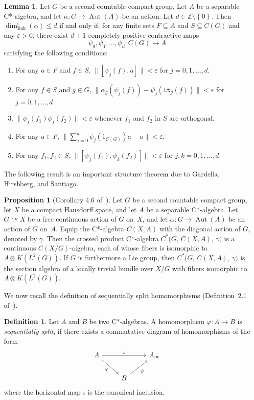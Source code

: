 \documentclass[10pt]{amsart}
\numberwithin{equation}{section}
\theoremstyle{definition}
\newtheorem{lem}[thm]{Lemma}
\newtheorem{prp}[thm]{Proposition}
\newtheorem{dfn}[thm]{Definition}
\newcommand{\gm}{\gamma}
\newcommand{\ep}{\varepsilon}
\newcommand{\ph}{\varphi}
\newcommand{\ps}{\psi}
\newcommand{\Z}{{\mathbb{Z}}}
\newcommand{\Aut}{{\operatorname{Aut}}}
\newcommand{\set}[1]{\left\{ #1 \right\}}
\newcommand{\RD}{{\operatorname{dim}}_{\operatorname{Rok}}^{\operatorname{c}}}
\begin{document}
\begin{lem}\label{D_6326_SeqSpl}
Let $G$ be a second countable compact group. Let $A$ be a separable C*-algebra,
and let $\alpha \colon G \to \Aut (A)$ be an action.
Let $d \in \Z \setminus \set{0}$.
Then $\RD (\alpha) \leq d$ if and only if, for any finite sets
$F \subseteq A$ and $S \subseteq C (G)$ and any $\ep > 0$,
there exist $d + 1$ completely positive contractive maps
\[
\psi_0, \psi_1, \ldots, \psi_d \colon C (G) \to A
\]
satisfying the following conditions:
\begin{enumerate}
\item
For any $a \in F$ and $f\in S$,
$\|[\psi_j(f), a]\| < \ep$ for $j = 0, 1, \ldots, d$.
\item
For any $f\in S$ and $g\in G$,
$\|\alpha_g (\psi_j(f)) - \psi_j(\mathtt{Lt}_g (f)) \| < \ep$
for $j = 0, 1, \ldots, d$
\item
$\|\psi_j(f_1) \psi_j(f_2) \| < \ep$
whenever $f_1$ and $f_2$ in $S$ are orthogonal.
\item
For any $a \in F$, $\|\sum_{j=0}^d \psi_j(1_{C (G)})a - a\| < \ep$.
\item
For any $f_1,f_2 \in S$,
$\|[\psi_j(f_1), \psi_k(f_2)]\| < \ep$ for $j, k = 0, 1, \ldots, d$.
\end{enumerate}
\end{lem}

The following result is an important structure theorem
due to Gardella, Hirshberg, and Santiago.

\begin{prp}[Corollary 4.6 of~\cite{GdlHrbStg}]\label{2003_structure_cx}
Let $G$ be a second countable compact group,
let $X$ be a compact Hausdorff space,
and let $A$ be a separable C*-algebra.
Let $G \curvearrowright X$ be a free continuous action of $G$ on~$X$,
and let $\alpha \colon G \to \Aut (A)$ be an action of $G$ on~$A$.
Equip the C*-algebra $C (X, A)$ with the diagonal action of $G$,
denoted by $\gamma$.
Then the crossed product C*-algebra
$C^* \bigl( G, \, C(X,A), \, \gm \bigr)$
is a continuous $C (X/G)$-algebra,
each of whose fibers is isomorphic to $A \otimes K(L^2 (G))$.
If $G$ is furthermore a Lie group,
then $C^* \bigl( G, \, C(X,A), \, \gm \bigr)$ is the
section algebra of a locally trivial bundle over $X/G$
with fibers isomorphic to $A \otimes K(L^2 (G))$.
\end{prp}

We now recall the definition of sequentially split homomorphisms
(Definition~2.1 of~\cite{barlak}).

\begin{dfn}
Let $A$ and $B$ be two C*-algebras. A homomorphism
$\ph\colon A \rightarrow B$ is \emph{sequentially split},
if there exists a commutative diagram of homomorphisms
of the form
\[
\begin{tikzcd}
A \arrow[rr, "\iota"] \arrow[dr, "\ph"'] & & A_\infty\\
& B \arrow[ur, "\ps" ' ] &
\end{tikzcd}
\]
where the horizontal map $\iota$ is the canonical inclusion.
\end{dfn}
\end{document}
